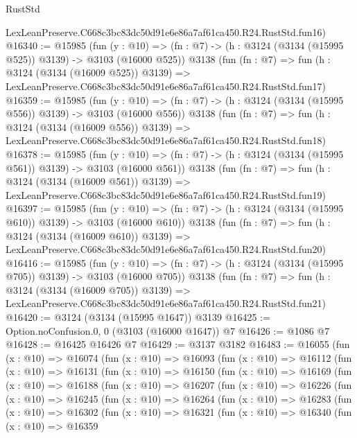 \begin{lexlean}{RustStd}
\begin{coremodule}
    LexLeanPreserve.C668c3bc83dc50d91e6e86a7af61ca450.R24.RustStd.fun16)
@16340 := @15985
    (fun (y : @10) => (fn : @7) -> (h : @3124 (@3134 (@15995 @525)) @3139) -> @3103 (@16000 @525))
    @3138
    (fun (fn : @7) =>
    fun (h : @3124 (@3134 (@16009 @525)) @3139) =>
    LexLeanPreserve.C668c3bc83dc50d91e6e86a7af61ca450.R24.RustStd.fun17)
@16359 := @15985
    (fun (y : @10) => (fn : @7) -> (h : @3124 (@3134 (@15995 @556)) @3139) -> @3103 (@16000 @556))
    @3138
    (fun (fn : @7) =>
    fun (h : @3124 (@3134 (@16009 @556)) @3139) =>
    LexLeanPreserve.C668c3bc83dc50d91e6e86a7af61ca450.R24.RustStd.fun18)
@16378 := @15985
    (fun (y : @10) => (fn : @7) -> (h : @3124 (@3134 (@15995 @561)) @3139) -> @3103 (@16000 @561))
    @3138
    (fun (fn : @7) =>
    fun (h : @3124 (@3134 (@16009 @561)) @3139) =>
    LexLeanPreserve.C668c3bc83dc50d91e6e86a7af61ca450.R24.RustStd.fun19)
@16397 := @15985
    (fun (y : @10) => (fn : @7) -> (h : @3124 (@3134 (@15995 @610)) @3139) -> @3103 (@16000 @610))
    @3138
    (fun (fn : @7) =>
    fun (h : @3124 (@3134 (@16009 @610)) @3139) =>
    LexLeanPreserve.C668c3bc83dc50d91e6e86a7af61ca450.R24.RustStd.fun20)
@16416 := @15985
    (fun (y : @10) => (fn : @7) -> (h : @3124 (@3134 (@15995 @705)) @3139) -> @3103 (@16000 @705))
    @3138
    (fun (fn : @7) =>
    fun (h : @3124 (@3134 (@16009 @705)) @3139) =>
    LexLeanPreserve.C668c3bc83dc50d91e6e86a7af61ca450.R24.RustStd.fun21)
@16420 := @3124 (@3134 (@15995 @1647)) @3139
@16425 := Option.noConfusion.{0, 0} (@3103 (@16000 @1647)) @7
@16426 := @1086 @7
@16428 := @16425 @16426 @7
@16429 := @3137 @3182
@16483 := @16055
    (fun (x : @10) =>
    @16074
      (fun (x : @10) =>
      @16093
        (fun (x : @10) =>
        @16112
          (fun (x : @10) =>
          @16131
            (fun (x : @10) =>
            @16150
              (fun (x : @10) =>
              @16169
                (fun (x : @10) =>
                @16188
                  (fun (x : @10) =>
                  @16207
                    (fun (x : @10) =>
                    @16226
                      (fun (x : @10) =>
                      @16245
                        (fun (x : @10) =>
                        @16264
                          (fun (x : @10) =>
                          @16283
                            (fun (x : @10) =>
                            @16302
                              (fun (x : @10) =>
                              @16321
                                (fun (x : @10) =>
                                @16340
                                  (fun (x : @10) =>
                                  @16359

\end{coremodule}
\end{lexlean}
